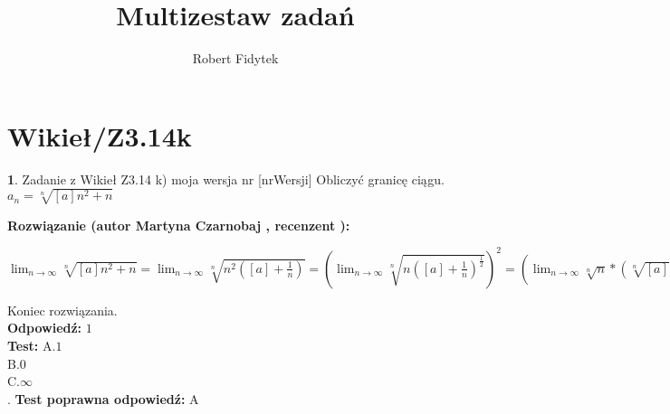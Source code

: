 \documentclass[12pt, a4paper]{article}
\title{Multizestaw zadań}
\author{Robert Fidytek}
\date{}
\theoremstyle{definition} %
\newtheorem{zad}{}
\newcommand{\kategoria}[1]{\section{#1}} %
\newcommand{\zadStart}[1]{\begin{zad}#1\newline} %
\newcommand{\zadStop}{\end{zad}}   %
\newcommand{\rozwStart}[2]{\noindent \textbf{Rozwiązanie (autor #1 , recenzent #2): }\newline} %
\newcommand{\rozwStop}{\newline}                                            %
\newcommand{\odpStart}{\noindent \textbf{Odpowiedź:}\newline}    %
\newcommand{\odpStop}{\newline}                                             %
\newcommand{\testStart}{\noindent \textbf{Test:}\newline} %
\newcommand{\testStop}{\newline} %
\newcommand{\kluczStart}{\noindent \textbf{Test poprawna odpowiedź:}\newline} %
\newcommand{\kluczStop}{\newline} %
\begin{document}
\maketitle


\kategoria{Wikieł/Z3.14k}
\zadStart{Zadanie z Wikieł Z3.14 k) moja wersja nr [nrWersji]}
Obliczyć granicę ciągu.\\
$ a_{n} = \sqrt[n]{[a]n^{2} + n} $\\
\zadStop
\rozwStart{Martyna Czarnobaj}{}
\begin{center}
	$ \displaystyle \lim_{n \to \infty} \sqrt[n]{[a]n^{2} + n} = \displaystyle \lim_{n \to \infty} \sqrt[n]{n^{2} ([a] + \frac{1}{n})} = (\displaystyle \lim_{n \to \infty} \sqrt[n]{n ([a] + \frac{1}{n})^{\frac{1}{2}}})^{2} = (\displaystyle \lim_{n \to \infty} \sqrt[n]{n} * (\sqrt[n]{[a]})^{\frac{1}{2}})^{2} = |\displaystyle \lim_{n \to \infty} \sqrt[n]{n} \to 1, \displaystyle \lim_{n \to \infty} \sqrt[n]{[a]} \to 1| = 1  $\\
\end{center}

Koniec rozwiązania.\\
\rozwStop
\odpStart
$ 1 $\\
\odpStop
\testStart
A.$ 1 $\\
B.$ 0 $\\
C.$ \infty $\\
.
\testStop
\kluczStart
A
\kluczStop
\end{document}
